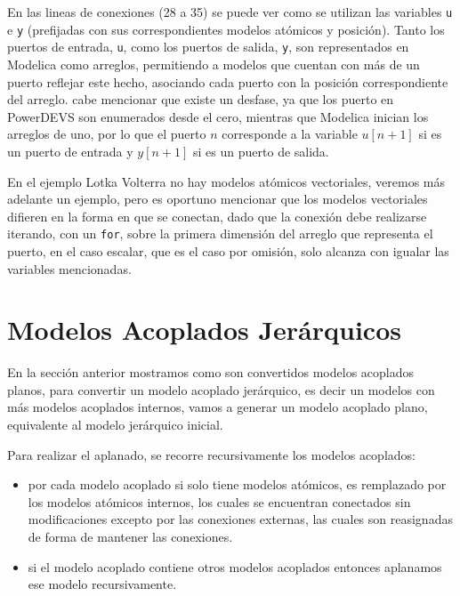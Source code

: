         En las lineas de conexiones (28 a 35) se puede ver como se utilizan las variables \texttt{u} e \texttt{y} (prefijadas con sus correspondientes modelos
        atómicos y posición). Tanto los puertos de entrada, \texttt{u}, como los puertos de salida, \texttt{y}, son representados en Modelica como arreglos,
        permitiendo a modelos que cuentan con más de un puerto reflejar este hecho, asociando cada puerto con la posición correspondiente del arreglo. 
        cabe mencionar que existe un desfase, ya que los puerto en PowerDEVS son enumerados desde el cero, mientras que Modelica inician los arreglos de uno, por lo
        que el puerto $n$ corresponde a la variable $u[n+1]$ si es un puerto de entrada y $y[n+1]$ si es un puerto de salida.

        En el ejemplo Lotka Volterra no hay modelos atómicos vectoriales, veremos más adelante un ejemplo, pero es oportuno mencionar que los modelos
        vectoriales difieren en la forma en que se conectan, dado que la conexión debe realizarse iterando, con un \texttt{for}, sobre la primera dimensión del 
        arreglo que representa el puerto, en el caso escalar, que es el caso por omisión, solo alcanza con igualar las variables mencionadas.


\section{Modelos Acoplados Jerárquicos}
        En la sección anterior mostramos como son convertidos modelos acoplados planos, para convertir un modelo acoplado jerárquico, es decir un modelos con más 
        modelos acoplados internos, vamos a generar un modelo acoplado plano, equivalente al modelo jerárquico inicial.

        Para realizar el aplanado, se recorre recursivamente los modelos acoplados:

        \begin{itemize}
                \item por cada modelo acoplado si solo tiene modelos atómicos, es remplazado por los modelos atómicos internos, los cuales se encuentran conectados 
                        sin modificaciones excepto por las conexiones externas, las cuales son reasignadas de forma de mantener las conexiones.
                \item si el modelo acoplado contiene otros modelos acoplados entonces aplanamos ese modelo recursivamente.
        \end{itemize} 

